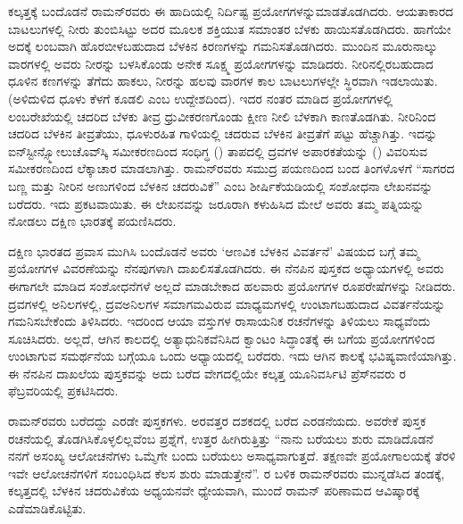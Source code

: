 ಕಲ್ಕತ್ತಕ್ಕೆ ಬಂದೊಡನೆ ರಾಮನ್‍ರವರು ಈ ಹಾದಿಯಲ್ಲಿ ನಿರ್ದಿಷ್ಟ ಪ್ರಯೋಗಗಳನ್ನು\break ಮಾಡತೊಡಗಿದರು. ಆಯತಾಕಾರದ ಬಾಟಲುಗಳಲ್ಲಿ ನೀರು ತುಂಬಿಸಿಟ್ಟು ಅದರ ಮೂಲಕ ಶಕ್ತಿಯುತ ಸಮಾಂತರ ಬೆಳಕು ಹಾಯಿಸತೊಡಗಿದರು. ಹಾಗೆಯೇ ಅದಕ್ಕೆ ಲಂಬವಾಗಿ ಹೊರಬೀಳಬಹುದಾದ ಬೆಳಕಿನ ಕಿರಣಗಳನ್ನು ಗಮನಿಸತೊಡಗಿದರು. ಮುಂದಿನ ಮೂರು\enginline{-}ನಾಲ್ಕು ವಾರಗಳಲ್ಲಿ ಅವರು ನೀರನ್ನು ಬಳಸಿಕೊಂಡು ಅನೇಕ ಸೂಕ್ಷ್ಮ ಪ್ರಯೋಗಗಳನ್ನು ಮಾಡಿದರು. ನೀರಿನಲ್ಲಿರಬಹುದಾದ ಧೂಳಿನ ಕಣಗಳನ್ನು ತೆಗೆದು ಹಾಕಲು, ನೀರನ್ನು ಹಲವು ವಾರಗಳ ಕಾಲ ಬಾಟಲುಗಳಲ್ಲೇ ಸ್ಥಿರವಾಗಿ ಇಡಲಾಯಿತು. (ಅಳಿದುಳಿದ ಧೂಳು ಕೆಳಗೆ ಕೂಡಲಿ ಎಂಬ ಉದ್ದೇಶದಿಂದ). ಇದರ ನಂತರ ಮಾಡಿದ ಪ್ರಯೋಗಗಳಲ್ಲಿ ಲಂಬರೇಖೆಯಲ್ಲಿ ಚದರಿದ ಬೆಳಕು ತೀವ್ರ ಧ್ರುವೀಕರಣಗೊಂಡು ಕ್ಷೀಣ ನೀಲಿ ಬೆಳಕಾಗಿ ಕಾಣತೊಡಗಿತು. ನೀರಿನಿಂದ ಚದರಿದ ಬೆಳಕಿನ ತೀವ್ರತೆಯು, ಧೂಳುರಹಿತ ಗಾಳಿಯಲ್ಲಿ ಚದರುವ ಬೆಳಕಿನ ತೀವ್ರತೆಗೆ  ಪಟ್ಟು ಹೆಚ್ಚಾಗಿತ್ತು. ಇದನ್ನು ಐನ್‍ಸ್ಟೀನ್\enginline{-}ಸ್ಮೋಲುಚೊವ್‍ಸ್ಕಿ ಸಮೀಕರಣದಿಂದ ಸಂಧಿಗ್ಧ () ತಾಪದಲ್ಲಿ ದ್ರವಗಳ ಅಪಾರಕತೆಯನ್ನು () ವಿವರಿಸುವ ಸಮೀಕರಣದಿಂದ ಲೆಕ್ಕಾಚಾರ ಮಾಡಲಾಗಿತ್ತು. ರಾಮನ್‍ರವರು ಸಮುದ್ರ ಪಯಣದಿಂದ ಬಂದ ತಿಂಗಳೊಳಗೆ “ಸಾಗರದ ಬಣ್ಣ ಮತ್ತು ನೀರಿನ ಅಣುಗಳಿಂದ ಬೆಳಕಿನ ಚದರುವಿಕೆ”  ಎಂಬ ಶೀರ್ಷಿಕೆಯಡಿಯಲ್ಲಿ ಸಂಶೋಧನಾ ಲೇಖನವನ್ನು ಬರೆದರು. ಇದು \textit{}  ಪ್ರಕಟವಾಯಿತು. ಈ ಲೇಖನವನ್ನು ಜರೂರಾಗಿ ಕಳುಹಿಸಿದ ಮೇಲೆ ಅವರು ತಮ್ಮ ಪತ್ನಿಯನ್ನು ನೋಡಲು ದಕ್ಷಿಣ ಭಾರತಕ್ಕೆ ಪಯಣಿಸಿದರು.

ದಕ್ಷಿಣ ಭಾರತದ ಪ್ರವಾಸ ಮುಗಿಸಿ ಬಂದೊಡನೆ ಅವರು ‘ಆಣವಿಕ ಬೆಳಕಿನ ವಿವರ್ತನೆ’  ವಿಷಯದ ಬಗ್ಗೆ ತಮ್ಮ ಪ್ರಯೋಗಗಳ ವಿವರಣೆಯನ್ನು ನೆನಪುಗಳಾಗಿ ದಾಖಲಿಸತೊಡಗಿದರು. ಈ ನೆನಪಿನ ಪುಸ್ತಕದ ಅಧ್ಯಾಯಗಳಲ್ಲಿ ಅವರು ಈಗಾಗಲೇ ಮಾಡಿದ ಸಂಶೋಧನೆಗಳೆ ಅಲ್ಲದೆ ಮಾಡಬೇಕಾದ ಹಲವಾರು ಪ್ರಯೋಗಗಳ ರೂಪರೇಷೆಗಳನ್ನು ನೀಡಿದರು. ದ್ರವಗಳಲ್ಲಿ ಅನಿಲಗಳಲ್ಲಿ, ದ್ರವ\enginline{-}ಅನಿಲಗಳ ಸಮಾಗಮವಿರುವ ಮಾಧ್ಯಮಗಳಲ್ಲಿ ಉಂಟಾಗಬಹುದಾದ ವಿವರ್ತನೆಯನ್ನು ಗಮನಿಸಬೇಕೆಂದು ತಿಳಿಸಿದರು. ಇದರಿಂದ ಆಯಾ ವಸ್ತುಗಳ ರಾಸಾಯನಿಕ ರಚನೆಗಳನ್ನು ತಿಳಿಯಲು ಸಾಧ್ಯವೆಂದು ಸೂಚಿಸಿದರು. ಅಲ್ಲದೆ, ಆಗಿನ ಕಾಲದಲ್ಲಿ ಅತ್ಯಾಧುನಿಕವೆನಿಸಿದ ಕ್ವಾಂಟಂ ಸಿದ್ಧಾಂತಕ್ಕೆ ಈ ಬಗೆಯ ಪ್ರಯೋಗಗಳಿಂದ ಉಂಟಾಗುವ ಸಮರ್ಥನೆಯ ಬಗ್ಗೆಯೂ ಒಂದು ಅಧ್ಯಾಯದಲ್ಲಿ ಬರೆದರು. ಇದು ಆಗಿನ ಕಾಲಕ್ಕೆ ಭವಿಷ್ಯವಾಣಿ\-ಯಾಗಿತ್ತು. ಈ ನೆನಪಿನ ದಾಖಲೆಯ ಪುಸ್ತಕವನ್ನು ಅದು ಬರೆದ ವೇಗದಲ್ಲಿಯೇ ಕಲ್ಕತ್ತ ಯೂನಿವರ್ಸಿಟಿ ಪ್ರೆಸ್‍ನವರು ರ ಫೆಬ್ರವರಿಯಲ್ಲಿ ಪ್ರಕಟಿಸಿದರು.

ರಾಮನ್‍ರವರು ಬರೆದದ್ದು ಎರಡೇ ಪುಸ್ತಕಗಳು. ಅರವತ್ತರ ದಶಕದಲ್ಲಿ ಬರೆದ \textit{} ಎರಡನೆಯದು. ಅವರೇಕೆ ಪುಸ್ತಕ ರಚನೆಯಲ್ಲಿ ತೊಡಗಿಸಿಕೊಳ್ಳಲಿಲ್ಲವೆಂಬ ಪ್ರಶ್ನೆಗೆ, ಉತ್ತರ ಹೀಗಿರುತ್ತಿತ್ತು\enginline{-} “ನಾನು ಬರೆಯಲು ಶುರು ಮಾಡಿದೊಡನೆ ನನಗೆ ಅಸಂಖ್ಯ ಆಲೋಚನೆಗಳು ಒಮ್ಮೆಗೇ ಬಂದು ಬರೆಯಲು ಅಸಾಧ್ಯವಾಗುತ್ತದೆ. ತಕ್ಷಣವೇ ಪ್ರಯೋಗಾಲಯಕ್ಕೆ ತೆರಳಿ ಇವೇ ಆಲೋಚನೆಗಳಿಗೆ ಸಂಬಂಧಿಸಿದ ಕೆಲಸ ಶುರು ಮಾಡುತ್ತೇನೆ”. ರ ಬಳಿಕ ರಾಮನ್‍ರವರು ಮುನ್ನಡೆಸಿದ ತಂಡಕ್ಕೆ, ಕಲ್ಕತ್ತದಲ್ಲಿ ಬೆಳಕಿನ ಚದರುವಿಕೆಯ ಅಧ್ಯಯನವೇ ಧ್ಯೇಯವಾಗಿ, ಮುಂದೆ ರಾಮನ್ ಪರಿಣಾಮದ ಆವಿಷ್ಕಾರಕ್ಕೆ ಎಡೆಮಾಡಿಕೊಟ್ಟಿತು.

